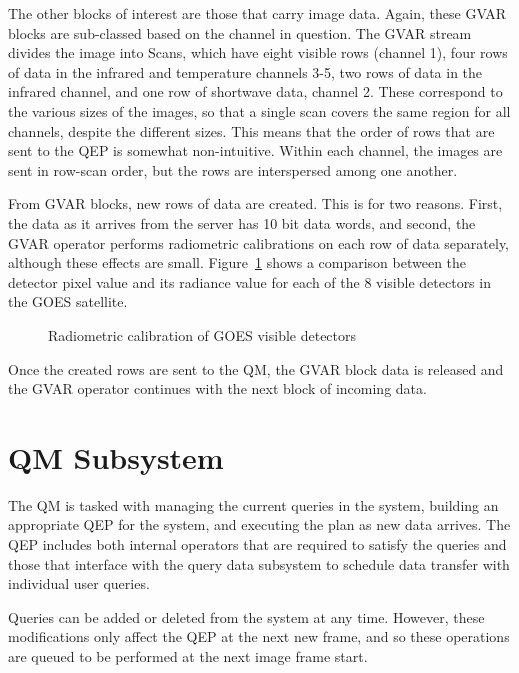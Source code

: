 \documentclass{ucdthesis}       %
\begin{document}
The other blocks of interest are those that carry image data.  Again,
these \ac{GVAR} blocks are sub-classed based on the channel in
question.  The \ac{GVAR} stream divides the image into Scans, which
have eight visible rows (channel 1), four rows of data in the infrared
and temperature channels 3-5, two rows of data in the infrared
channel, and one row of shortwave data, channel 2.  These correspond
to the various sizes of the images, so that a single scan covers the
same region for all channels, despite the different sizes.  This means
that the order of rows that are sent to the \ac{QEP} is somewhat
non-intuitive.  Within each channel, the images are sent in row-scan
order, but the rows are interspersed among one another.

From \ac{GVAR} blocks, new rows of data are created.  This is for two
reasons.  First, the data as it arrives from the server has 10 bit
data words, and second, the \ac{GVAR} operator performs radiometric
calibrations on each row of data separately, although these effects
are small.  Figure~\ref{fig:calibration} shows a comparison between
the detector pixel value and its radiance value for each of the 8
visible detectors in the \ac{GOES} satellite.

\begin{figure}[htb]
  \centering
  
  \caption{Radiometric calibration of \ac{GOES} visible detectors}
  \label{fig:calibration}
\end{figure}

Once the created rows are sent to the \ac{QM}, the \ac{GVAR} block
data is released and the \ac{GVAR} operator continues with the next
block of incoming data.

\section{\acf{QM} Subsystem}
\label{sec:on-qm}

The \acf{QM} is tasked with managing the current queries in the
system, building an appropriate \acf{QEP} for the system, and
executing the plan as new data arrives.  The \ac{QEP} includes both
internal operators that are required to satisfy the queries and those
that interface with the query data subsystem to schedule data
transfer with individual user queries.

Queries can be added or deleted from the system at any time.  However,
these modifications only affect the \ac{QEP} at the next new frame,
and so these operations are queued to be performed at the next image
frame start.
\end{document}
